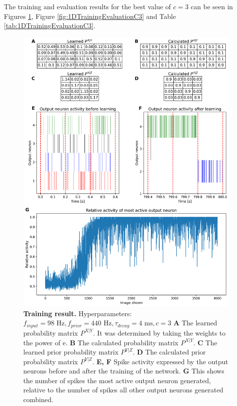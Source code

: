 The training and evaluation results for the best value of $c = 3$ can be seen in Figures \ref{fig:1DTrainingC3}, Figure \ref{fig:1DTrainingEvaluationC3} and Table \ref{tab:1DTrainingEvaluationC3}.
\begin{figure}
  \includegraphics[width=0.8\linewidth]{figures/1D/training/trainingPlot_98_440_4_c3.png}
  \caption{\textbf{Training result.} Hyperparameters: $f_{input} = 98\text{ Hz}, f_{prior} = 440\text{ Hz}, \tau_{decay} = 4\text{ ms}, c = 3$  \textbf{A} The learned probability matrix $P^{X|Y}$. It was determined by taking the weights to the power of e. \textbf{B} The calculated probability matrix $P^{X|Y}$. \textbf{C} The learned prior probability matrix $P^{Y|Z}$. \textbf{D} The calculated prior probability matrix $P^{Y|Z}$.
 \textbf{E, F} Spike activity expressed by the output neurons before and after the training of the network. \textbf{G} This shows the number of spikes the most active output neuron generated, relative to the number of spikes all other output neurons generated combined.}
  \label{fig:1DTrainingC3}
\end{figure}

